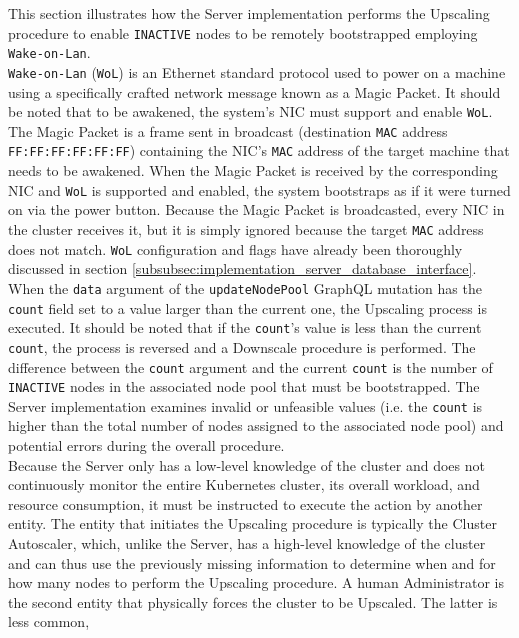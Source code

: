 This section illustrates how the Server implementation performs the Upscaling
procedure to enable \texttt{INACTIVE} nodes to be remotely bootstrapped employing
\texttt{Wake-on-Lan}. \\ %
\texttt{Wake-on-Lan} (\texttt{WoL}) is an Ethernet standard protocol used to
power on a machine using a specifically crafted network message known as a Magic
Packet\cite{wake_on_lan}. It should be noted that to be awakened, the system's NIC
must support and enable \texttt{WoL}. The Magic Packet is a frame sent in broadcast
(destination \texttt{MAC} address \texttt{FF:FF:FF:FF:FF:FF}) containing the NIC's
\texttt{MAC} address of the target machine that needs to be awakened. When the Magic
Packet is received by the corresponding NIC and \texttt{WoL} is supported and
enabled, the system bootstraps as if it were turned on via the power button.
Because the Magic Packet is broadcasted, every NIC in the cluster receives it,
but it is simply ignored because the target \texttt{MAC} address does not match.
\texttt{WoL} configuration and flags have already been thoroughly discussed in section
\ref{subsubsec:implementation_server_database_interface}. \\ %
When the \texttt{data} argument of the \texttt{updateNodePool} GraphQL mutation has
the \texttt{count} field set to a value larger than the current one, the Upscaling
process is executed. It should be noted that if the \texttt{count}'s value is less
than the current \texttt{count}, the process is reversed and a Downscale procedure
is performed. The difference between the \texttt{count} argument and the current
\texttt{count} is the number of \texttt{INACTIVE} nodes in the associated node pool
that must be bootstrapped. The Server implementation examines invalid or
unfeasible values (i.e. the \texttt{count} is higher than the total number of nodes
assigned to the associated node pool) and potential errors during the overall
procedure. \\ %
Because the Server only has a low-level knowledge of the cluster and does not
continuously monitor the entire Kubernetes cluster, its overall workload, and
resource consumption, it must be instructed to execute the action by another entity.
The entity that initiates the Upscaling procedure is typically the Cluster
Autoscaler, which, unlike the Server, has a high-level knowledge of the cluster and
can thus use the previously missing information to determine when and for how many
nodes to perform the Upscaling procedure. A human Administrator is the second
entity that physically forces the cluster to be Upscaled. The latter is less common,
